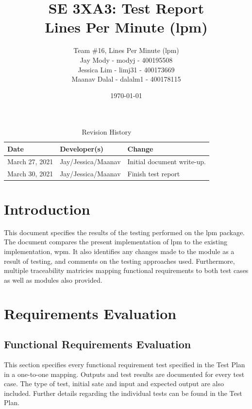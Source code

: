 \documentclass[12pt, titlepage]{article}
\title{\textbf{SE 3XA3: Test Report}\\Lines Per Minute (lpm)}
\author{Team \#16, Lines Per Minute (lpm)\\
Jay Mody - modyj - 400195508\\
Jessica Lim - limj31 - 400173669\\
Maanav Dalal - dalalm1 - 400178115\\
}
\date{\today}
\begin{document}
\maketitle
\begin{table}[hp]
\caption{Revision History} \label{TblRevisionHistory}
\begin{tabularx}{\textwidth}{llX}
\toprule
\textbf{Date} & \textbf{Developer(s)} & \textbf{Change}\\
\midrule
March 27, 2021 & Jay/Jessica/Maanav & Initial document write-up. \\
\midrule
March 30, 2021 & Jay/Jessica/Maanav & Finish test report \\
\bottomrule
\end{tabularx}
\end{table}

\newpage

\maketitle

\tableofcontents
\listoftables

\newpage


\section{Introduction}
This document specifies the results of the testing performed on the lpm package. The document compares the present implementation of lpm to the existing implementation, wpm. It also identifies any changes made to the module as a result of testing, and comments on the testing approaches used. Furthermore, multiple traceability matricies mapping functional requirements to both test cases as well as modules also provided. \\

\section{Requirements Evaluation}
\subsection{Functional Requirements Evaluation}
This section specifies every functional requirement test specified in the Test Plan in a one-to-one mapping. Outputs and test results are documented for every test case. The type of test, initial sate and input and expected output are also included. Further details regarding the individual tests can be found in the Test Plan.\\
\end{document}

